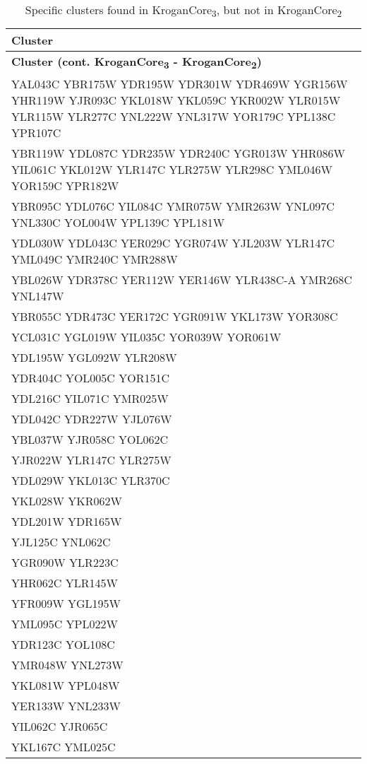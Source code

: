 \setlength{\extrarowheight}{2pt}
\renewcommand{\arraystretch}{1.2}
\begin{longtable}{| m{27em} |}
\caption{Specific clusters found in KroganCore\textsubscript{3}, but not in KroganCore\textsubscript{2}} \\
\hline
\textbf{Cluster} \\
\hline
\endfirsthead
\hline
\textbf{Cluster (cont. KroganCore\textsubscript{3} - KroganCore\textsubscript{2})} \\
\hline
\endhead
\hline
\endfoot
\hline
\endlastfoot
YAL043C YBR175W YDR195W YDR301W YDR469W YGR156W YHR119W YJR093C YKL018W YKL059C YKR002W YLR015W YLR115W YLR277C YNL222W YNL317W YOR179C YPL138C YPR107C \\
\hline
YBR119W YDL087C YDR235W YDR240C YGR013W YHR086W YIL061C YKL012W YLR147C YLR275W YLR298C YML046W YOR159C YPR182W \\
\hline
YBR095C YDL076C YIL084C YMR075W YMR263W YNL097C YNL330C YOL004W YPL139C YPL181W \\
\hline
YDL030W YDL043C YER029C YGR074W YJL203W YLR147C YML049C YMR240C YMR288W \\
\hline
YBL026W YDR378C YER112W YER146W YLR438C-A YMR268C YNL147W \\
\hline
YBR055C YDR473C YER172C YGR091W YKL173W YOR308C \\
\hline
YCL031C YGL019W YIL035C YOR039W YOR061W \\
\hline
YDL195W YGL092W YLR208W \\
\hline
YDR404C YOL005C YOR151C \\
\hline
YDL216C YIL071C YMR025W \\
\hline
YDL042C YDR227W YJL076W \\
\hline
YBL037W YJR058C YOL062C \\
\hline
YJR022W YLR147C YLR275W \\
\hline
YDL029W YKL013C YLR370C \\
\hline
YKL028W YKR062W \\
\hline
YDL201W YDR165W \\
\hline
YJL125C YNL062C \\
\hline
YGR090W YLR223C \\
\hline
YHR062C YLR145W \\
\hline
YFR009W YGL195W \\
\hline
YML095C YPL022W \\
\hline
YDR123C YOL108C \\
\hline
YMR048W YNL273W \\
\hline
YKL081W YPL048W \\
\hline
YER133W YNL233W \\
\hline
YIL062C YJR065C \\
\hline
YKL167C YML025C \\
\hline
\end{longtable}